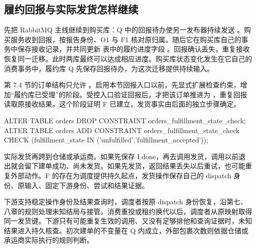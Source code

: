 \subsection*{履约回报与实际发货怎样继续}

先把 RabbitMQ 主线继续到购买库：Q 中的回报待办使另一发布器持续发送 。购买服务收到回报，按报告身份、O1 与 F1 核对原归属。随后它在购买库自己的事务中保存接收记录，并共同更新  表中的履约进度字段 。回报确认丢失，重复接收恢复同一迁移。此时两库最终可以达成相应进度。购买库状态变化发生在它自己的消费事务中，履约库 Q 先保存回报待办，为这次迁移提供持续输入。

第 7.4 节的订单结构只允许 。启用本节回报入口以前，先显式扩展检查约束，增加“履约库已受理”的阶段。受控入口验证回报后，才把该订单推进为 ，重复回报读取原接收结果。这个阶段证明 F 已建立，发货事实由后面的独立步骤确定。

\begin{BookCode}
ALTER TABLE orders DROP CONSTRAINT orders_fulfillment_state_check;
ALTER TABLE orders ADD CONSTRAINT orders_fulfillment_state_check
  CHECK (fulfillment_state IN ('unfulfilled','fulfillment_accepted'));
\end{BookCode}

实际发货再跨到仓储或承运商。如果先保存 I.done，再去调用发货，调用以前退出就会留下建单成功、尚未发货。如果先发货，返回结果丢失以后重试，也可能重复外部动作。F 的存在为调度提供持久起点，发货操作保存自己的 dispatch 身份、原输入、固定下游身份、尝试和结果证据。

下游支持稳定操作身份及结果查询时，调度者按原 dispatch 身份恢复，沿第七、八章的规则处理未知结局与接管。消费重投或租约换代以后，调度者从原映射取得同一发货键。下游只有可能重复生效的调用、又没有足够排他和查询证据时，未知结果进入持久核查。初次建单的不变量在 Q 内成立，外部包裹次数则依据仓储或承运商实际执行的规则判断。
